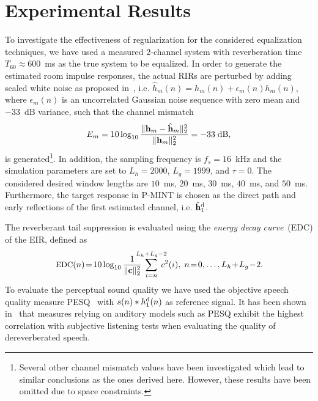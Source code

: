 \documentclass{article}
\begin{document}
\vspace{-0.1cm}
\section{Experimental Results}
\label{sec: exp}
\vspace{-0.2cm}

To investigate the effectiveness of regularization for the considered equalization techniques, we have used a measured $2$-channel system with reverberation time $T_{60} \approx 600$~ms as the true system to be equalized. 
In order to generate the estimated room impulse responses, the actual RIRs are perturbed by adding scaled white noise as proposed in~\cite{Cho_ITSA_1999}, i.e. $\hat{h}_m(n) = h_m(n) + {\epsilon}_m(n)h_m(n)$, where ${\epsilon}_m(n)$ is an uncorrelated Gaussian noise sequence with zero mean and $-33$~dB variance, such that the channel mismatch
\begin{equation}
  E_m = 10 \log_{10} \frac{\|\mathbf{h}_m-\hat{\mathbf{h}}_m\|_2^2}{\|\mathbf{h}_m\|_2^2} = -33{\; \rm dB},
\end{equation}
is generated\footnote{Several other channel mismatch values have been investigated which lead to similar conclusions as the ones derived here. 
However, these results have been omitted due to space constraints.}.
In addition, the sampling frequency is $f_s = 16$~kHz and the simulation parameters are set to $L_h = 2000$, $L_g = 1999$, and $\tau = 0$.
The considered desired window lengths are $10$~ms, $20$~ms, $30$~ms, $40$~ms, and $50$~ms.
Furthermore, the target response in P-MINT is chosen as the direct path and early reflections of the first estimated channel, i.e. $\hat{\mathbf{h}}_1^{\rm d}$.

The reverberant tail suppression is evaluated using the \emph{energy decay curve}~(EDC) of the EIR, defined as
\begin{equation}
\small
\hspace{-0.01cm} \hbox{EDC}(n)\! = \!10 \log_{10}\frac{1}{\|\mathbf{c}\|_2^2}\!\!\!\!\!\sum_{i=n}^{L_h+L_g-2}\!\!\!\!\!c^2(i), \; n \!=\! 0,  \ldots,  L_h\!+\!L_g\!-\!2. \hspace{-0.06cm}
\end{equation}
To evaluate the perceptual sound quality we have used the objective speech quality measure PESQ~\cite{PESQ} with $s(n) \ast h_1^{\rm d}(n)$ as reference signal.
It has been shown in~\cite{Goetze_AES_2010} that measures relying on auditory models such as PESQ exhibit the highest correlation with subjective listening tests when evaluating the quality of dereverberated speech.
\end{document}
